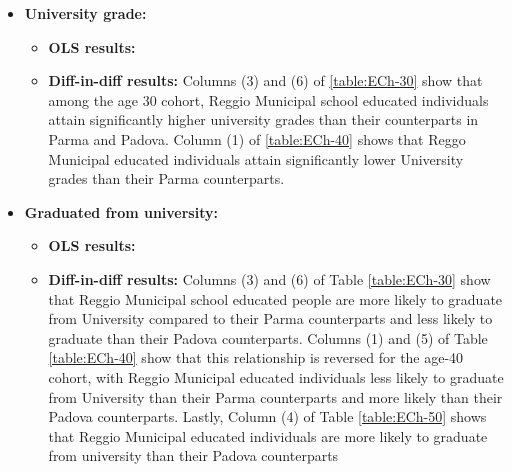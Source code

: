 \documentclass[11pt]{article}
\begin{document}
\begin{itemize}
\item \textbf{University grade:} 
	\begin{itemize}
	\item \textbf{OLS results:}%
	\item \textbf{Diff-in-diff results:} Columns (3) and (6) of  \ref{table:ECh-30} show that among the age 30 cohort, Reggio Municipal school educated individuals attain significantly higher university grades than their counterparts in Parma and Padova. Column (1) of  \ref{table:ECh-40} shows that Reggo Municipal educated individuals attain significantly lower University grades than their Parma counterparts.
\end{itemize}

\item \textbf{Graduated from university:} 
	\begin{itemize}
	\item \textbf{OLS results:} %
	\item \textbf{Diff-in-diff results:}  Columns (3) and (6) of Table \ref{table:ECh-30} show that Reggio Municipal school educated people are more likely to graduate from University compared to their Parma counterparts and less likely to graduate than their Padova counterparts. Columns (1) and (5) of Table \ref{table:ECh-40} show that this relationship is reversed for the age-40 cohort, with  Reggio Municipal educated individuals  less likely to graduate from University than their Parma counterparts and more likely than their Padova counterparts. Lastly, Column (4) of Table \ref{table:ECh-50} shows that Reggio Municipal educated individuals are more likely to graduate from university than their Padova counterparts 
\end{itemize}



\end{itemize}
\end{document}
